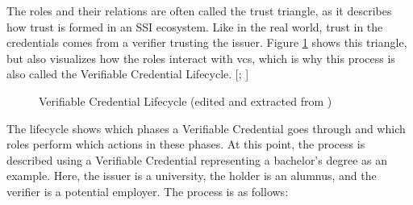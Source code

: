         The roles and their relations are often called the trust triangle, as it describes how trust is formed in an \ac{SSI} ecosystem. Like in the real world, trust in the credentials comes from a verifier trusting the issuer. Figure \ref{figure: vc lifecycle} shows this triangle, but also visualizes how the roles interact with \acp{vc}, which is why this process is also called the Verifiable Credential Lifecycle. [\citealp[pp. 25-26]{preukschat_self-sovereign_2021}; \citealp{sporny_verifiable_2019}]
        
        \begin{figure}[htp]
    	    \centering
    	    \makebox[\textwidth]{}
            \caption[Verifiable Credential Lifecycle]{Verifiable Credential Lifecycle (edited and extracted from \cite{sporny_verifiable_2019})}
            \label{figure: vc lifecycle}
        \end{figure}
        
        The lifecycle shows which phases a Verifiable Credential goes through and which roles perform which actions in these phases. At this point, the process is described using a Verifiable Credential representing a bachelor's degree as an example. Here, the issuer is a university, the holder is an alumnus, and the verifier is a potential employer. The process is as follows:  \cite{sporny_verifiable_2019}
        
